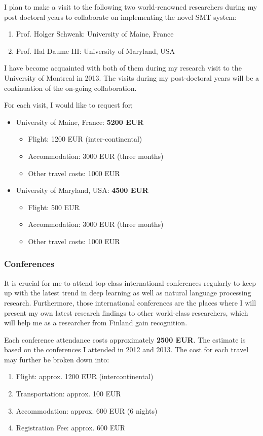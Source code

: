 \documentclass[11pt, oneside]{essay}
\begin{document}
I plan to make a visit to the following two world-renowned
researchers during my post-doctoral years to collaborate on
implementing the novel SMT system:
\begin{enumerate}
\item Prof. Holger Schwenk: University of Maine, France
\item Prof. Hal Daume III: University of Maryland, USA
\end{enumerate}

I have become acquainted with both of them during my research
visit to the University of Montreal in 2013. The visits during my
post-doctoral years will be a continuation of the on-going
collaboration.

For each visit, I would like to request for;
\begin{itemize}
\item University of Maine, France: \textbf{5200 EUR}
\begin{itemize}
    \item Flight: 1200 EUR (inter-continental)
    \item Accommodation: 3000 EUR (three months)
    \item Other travel costs: 1000 EUR
\end{itemize}
\item University of Maryland, USA: \textbf{4500 EUR}
\begin{itemize}
    \item Flight: 500 EUR
    \item Accommodation: 3000 EUR (three months)
    \item Other travel costs: 1000 EUR
\end{itemize}
\end{itemize}


\subsubsection{Conferences}

It is crucial for me to attend top-class international
conferences regularly to keep up with the latest trend in deep
learning as well as natural language processing research.
Furthermore, those international conferences are the places where
I will present my own latest research findings to other
world-class researchers, which will help me as a researcher from
Finland gain recognition.

Each conference attendance costs approximately \textbf{2500 EUR}.
The estimate is based on the conferences I attended in 2012 and
2013. The cost for each travel may further be broken down into:
\begin{enumerate}
    \item Flight: approx. 1200 EUR (intercontinental)
    \item Transportation: approx. 100 EUR
    \item Accommodation: approx. 600 EUR (6 nights)
    \item Registration Fee: approx. 600 EUR
\end{enumerate}
\end{document}
